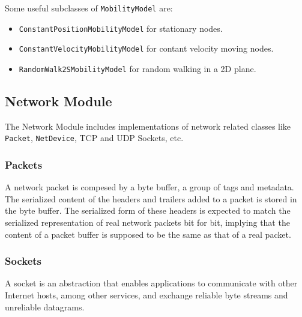 Some useful subclasses of \texttt{MobilityModel} are:
\begin{itemize}[noitemsep, topsep=0pt]
  \item \texttt{ConstantPositionMobilityModel} for stationary nodes.
  \item \texttt{ConstantVelocityMobilityModel} for contant velocity moving nodes.
  \item \texttt{RandomWalk2SMobilityModel} for random walking in a 2D plane.
\end{itemize}


\subsection{Network Module}
The Network Module includes implementations of network related classes like 
\texttt{Packet}, \texttt{NetDevice}, TCP and UDP Sockets, etc.

\subsubsection{Packets}
A network packet is compesed by a byte buffer, a group of tags and metadata.
The serialized content of the headers and trailers added to a packet is stored in the byte buffer. 
The serialized form of these headers is expected to match the serialized representation of real 
network packets bit for bit, implying that the content of a packet buffer is supposed to be the 
same as that of a real packet.

\subsubsection{Sockets}
A socket is an abstraction that enables applications to communicate with other Internet hosts, among other services,
and exchange reliable byte streams and unreliable datagrams.

